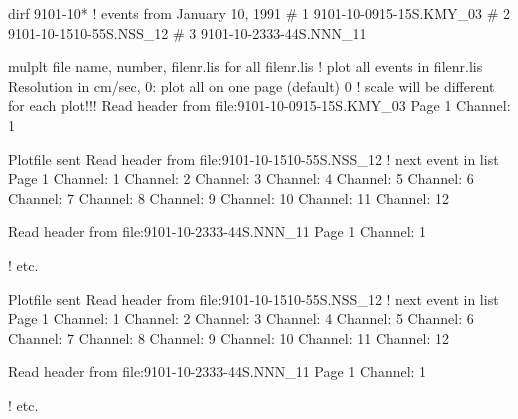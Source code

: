 \begin{boxedverbatim}
dirf 9101-10*                      ! events from January 10, 1991
#  1  9101-10-0915-15S.KMY_03  
#  2  9101-10-1510-55S.NSS_12  
#  3  9101-10-2333-44S.NNN_11  

mulplt
file name, number, filenr.lis for all   
filenr.lis             ! plot all events in filenr.lis
 Resolution in cm/sec, 0: plot all on one page (default)
0                      ! scale will be different for each plot!!! 
Read header from file:9101-10-0915-15S.KMY_03                   
 Page           1
 Channel:           1

Plotfile sent
Read header from file:9101-10-1510-55S.NSS_12       ! next event in list  
 Page           1
 Channel:           1
 Channel:           2
 Channel:           3
 Channel:           4
 Channel:           5
 Channel:           6
 Channel:           7
 Channel:           8
 Channel:           9
 Channel:          10
 Channel:          11
 Channel:          12
 
Read header from file:9101-10-2333-44S.NNN_11          
 Page           1
 Channel:           1

 ! etc.


Plotfile sent
Read header from file:9101-10-1510-55S.NSS_12       ! next event in list  
 Page           1
 Channel:           1
 Channel:           2
 Channel:           3
 Channel:           4
 Channel:           5
 Channel:           6
 Channel:           7
 Channel:           8
 Channel:           9
 Channel:          10
 Channel:          11
 Channel:          12
 
Read header from file:9101-10-2333-44S.NNN_11          
 Page           1
 Channel:           1

 ! etc.
\end{boxedverbatim}
